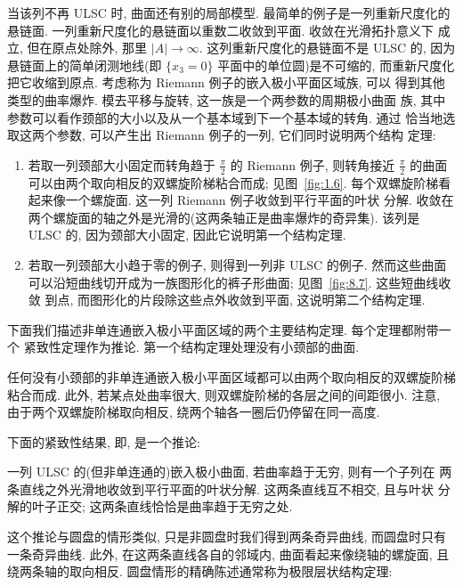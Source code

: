 当该列不再 ULSC 时, 曲面还有别的局部模型. 最简单的例子是一列重新尺度化的
悬链面. 一列重新尺度化的悬链面以重数二收敛到平面. 收敛在光滑拓扑意义下
成立, 但在原点处除外, 那里 $|A|\to\infty$. 这列重新尺度化的悬链面不是 ULSC
的, 因为悬链面上的简单闭测地线(即 $\{x_3=0\}$ 平面中的单位圆)是不可缩的,
而重新尺度化把它收缩到原点. 考虑称为 Riemann 例子的嵌入极小平面区域族, 可以
得到其他类型的曲率爆炸. 模去平移与旋转, 这一族是一个两参数的周期极小曲面
族, 其中参数可以看作颈部的大小以及从一个基本域到下一个基本域的转角. 通过
恰当地选取这两个参数, 可以产生出 Riemann 例子的一列, 它们同时说明两个结构
定理:

\begin{enumerate}
\item 若取一列颈部大小固定而转角趋于 $\frac\pi2$ 的 Riemann 例子, 则转角接近
$\frac\pi2$ 的曲面可以由两个取向相反的双螺旋阶梯粘合而成; 见图~\ref{fig:1.6}.
每个双螺旋阶梯看起来像一个螺旋面. 这一列 Riemann 例子收敛到平行平面的叶状
分解. 收敛在两个螺旋面的轴之外是光滑的(这两条轴正是曲率爆炸的奇异集).
该列是 ULSC 的, 因为颈部大小固定, 因此它说明第一个结构定理.
\item 若取一列颈部大小趋于零的例子, 则得到一列非 ULSC 的例子. 然而这些曲面
可以沿短曲线切开成为一族图形化的裤子形曲面; 见图~\ref{fig:8.7}. 这些短曲线收敛
到点, 而图形化的片段除这些点外收敛到平面, 这说明第二个结构定理.
\end{enumerate}

下面我们描述非单连通嵌入极小平面区域的两个主要结构定理. 每个定理都附带一个
紧致性定理作为推论. 第一个结构定理处理没有小颈部的曲面.

\begin{theorem}
\label{thm:8.24}
任何没有小颈部的非单连通嵌入极小平面区域都可以由两个取向相反的双螺旋阶梯
粘合而成. 此外, 若某点处曲率很大, 则双螺旋阶梯的各层之间的间距很小. 注意,
由于两个双螺旋阶梯取向相反, 绕两个轴各一圈后仍停留在同一高度.
\end{theorem}

下面的紧致性结果, 即, 是一个推论:

\begin{corollary}
\label{cor:8.25}
一列 ULSC 的(但非单连通的)嵌入极小曲面, 若曲率趋于无穷, 则有一个子列在
两条直线之外光滑地收敛到平行平面的叶状分解. 这两条直线互不相交, 且与叶状
分解的叶子正交; 这两条直线恰恰是曲率趋于无穷之处.
\end{corollary}

这个推论与圆盘的情形类似, 只是非圆盘时我们得到两条奇异曲线, 而圆盘时只有
一条奇异曲线. 此外, 在这两条直线各自的邻域内, 曲面看起来像绕轴的螺旋面,
且绕两条轴的取向相反. 圆盘情形的精确陈述通常称为极限层状结构定理:


